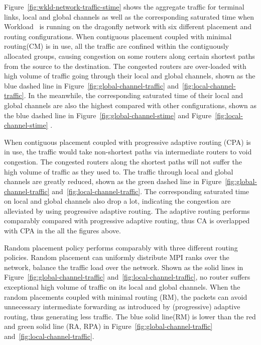 Figure~\ref{fig:wkld-network-traffic-stime} shows the aggregate traffic for terminal links, local and global channels as well as the corresponding saturated time when Workload~ is running on the dragonfly network with six different placement and routing configurations. When contiguous placement coupled with minimal routing(CM) is in use, all the traffic are confined within the contiguously allocated groups, causing congestion on some routers along certain shortest paths from the source to the destination. The congested routers are over-loaded with high volume of traffic going through their local and global channels, shown as the blue dashed line in Figure~\ref{fig:global-channel-traffic} and~\ref{fig:local-channel-traffic}. In the meanwhile, the corresponding saturated time of their local and global channels are also the highest compared with other configurations, shown as the blue dashed line in Figure~\ref{fig:global-channel-stime} and Figure~\ref{fig:local-channel-stime} .

When contiguous placement coupled with progressive adaptive routing (CPA) is in use, the traffic would take non-shortest paths via intermediate routers to void congestion. The congested routers along the shortest paths will not suffer the high volume of traffic as they used to. The traffic through local and global channels are greatly reduced, shown as the green dashed line in Figure~\ref{fig:global-channel-traffic} and~\ref{fig:local-channel-traffic}. The corresponding saturated time on local and global channels also drop a lot, indicating the congestion are alleviated by using progressive adaptive routing. The adaptive routing performs comparably compared with progressive adaptive routing, thus CA is overlapped with CPA in the all the figures above.


Random placement policy performs comparably with three different routing policies.
Random placement can uniformly distribute MPI ranks over the network, balance the traffic load over the network. Shown as the solid lines in Figure~\ref{fig:global-channel-traffic} and~\ref{fig:local-channel-traffic}, no router suffers exceptional high volume of traffic on its local and global channels. When the random placements coupled with minimal routing (RM), the packets can avoid unnecessary intermediate forwarding as introduced by (progressive) adaptive routing, thus generating less traffic. The blue solid line(RM) is lower than the red and green solid line (RA, RPA) in Figure~\ref{fig:global-channel-traffic} and~\ref{fig:local-channel-traffic}. 

